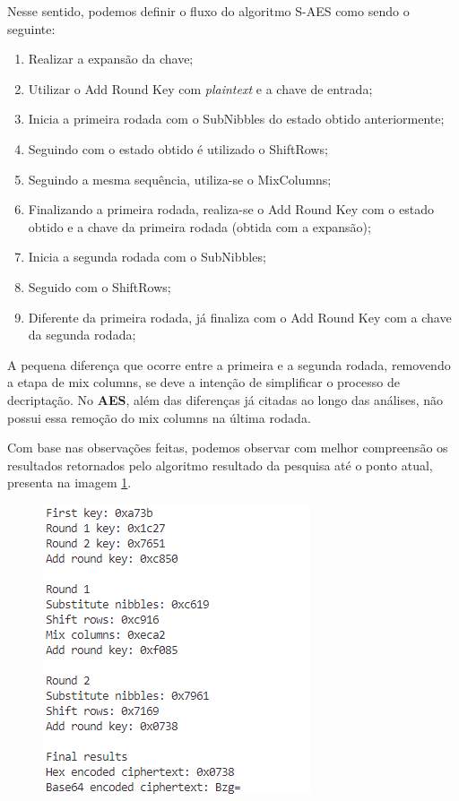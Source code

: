 \documentclass[12pt]{article}
\begin{document}
Nesse sentido, podemos definir o fluxo do algoritmo S-AES como sendo o seguinte:
\begin{enumerate}
  \item Realizar a expansão da chave;
  \item Utilizar o Add Round Key com \textit{plaintext} e a chave de entrada;
  \item Inicia a primeira rodada com o SubNibbles do estado obtido anteriormente;
  \item Seguindo com o estado obtido é utilizado o ShiftRows;
  \item Seguindo a mesma sequência, utiliza-se o MixColumns;
  \item Finalizando a primeira rodada, realiza-se o Add Round Key com o estado obtido e a chave da primeira rodada (obtida com a expansão);
  \item Inicia a segunda rodada com o SubNibbles;
  \item Seguido com o ShiftRows;
  \item Diferente da primeira rodada, já finaliza com o Add Round Key com a chave da segunda rodada;
\end{enumerate}

A pequena diferença que ocorre entre a primeira e a segunda rodada, removendo a etapa de mix columns, se deve a intenção de simplificar o processo de decriptação. No \textbf{AES}, além das diferenças já citadas ao longo das análises, não possui essa remoção do mix columns na última rodada. 

Com base nas observações feitas, podemos observar com melhor compreensão os resultados retornados pelo algoritmo resultado da pesquisa até o ponto atual, presenta na imagem \ref{fig:S-AES Results}.

\begin{figure}[h]
    \centering
    \includegraphics[width = 0.5\linewidth]{Imagens/S-AES-Results.png}  
    \label{fig:S-AES Results}
\end{figure}
\end{document}
